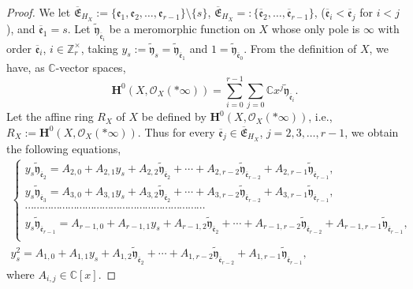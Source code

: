 \documentclass[pdftex]{sigma}
\def\CC{{\mathbb C}}
\def\ZZ{{\mathbb Z}}
\def\bH{{\mathbf F}}
\def\bH{{\mathbf H}}
\def\cO{{\mathcal O}}
\def\fe{{\mathfrak e}}
\def\tfy{{\widetilde{\mathfrak y}}}
\def\BfE{{\overline{\mathfrak E}}}
\def\Bfe{{\overline{\mathfrak e}}}
\numberwithin{equation}{section}
\begin{document}
\begin{proof}We let $\BfE_{H_X} :=\{\fe_1, \fe_2, \dots, \fe_{r-1}\}\setminus \{s\}$, $\BfE_{H_X} =:\{\Bfe_2, \dots, \Bfe_{r-1}\}$, ($\Bfe_i<\Bfe_j$ for $i<j$), and $\Bfe_1=s$.
Let $\tfy_{\Bfe_i}$ be a meromorphic function on $X$ whose only pole is $\infty$ with order $\Bfe_i$, $i\in \ZZ_r^\times$, taking $y_s:=\tfy_{s}=\tfy_{\Bfe_{1}}$ and $1=\tfy_{\Bfe_{0}}$.
From the definition of $X$, we have, as $\CC$-vector spaces,
\begin{equation}
\bH^0(X,\cO_X(*\infty))
= \sum_{i=0}^{r-1}\sum_{j=0} \CC x^j \tfy_{\Bfe_i}.
\label{2eq:R_Xdecompose1}
\end{equation}
Let the affine ring $R_X$ of $X$ be defined by $\bH^0(X,\cO_X(*\infty))$, i.e., $R_X:=\bH^0(X,\cO_X(*\infty))$.
Thus for every $\Bfe_j\in \BfE_{H_X}$, $j=2,3,\dots,r-1$, we obtain the following equations,
\begin{gather}
\begin{cases}
y_{s} \tfy_{\Bfe_2} = A_{2,0} +
 A_{2,1} y_{s}+
 A_{2,2} \tfy_{\Bfe_{2}}+
 \cdots +
 A_{2,r-2} \tfy_{\Bfe_{r-2}}+
 A_{2,r-1} \tfy_{\Bfe_{r-1}}, \\
y_{s} \tfy_{\Bfe_3}= A_{3,0} +
 A_{3,1} y_{s}+
 A_{3,2} \tfy_{\Bfe_{2}}+
 \cdots +
 A_{3,r-2} \tfy_{\Bfe_{r-2}}+
 A_{3,r-1} \tfy_{\Bfe_{r-1}}, \\
\cdots\cdots\cdots\cdots\cdots\cdots\cdots\cdots\cdots\cdots\cdots\cdots\cdots\cdots\cdots\cdots\cdots\cdots\cdots\cdots\cdots\\
y_{s} \tfy_{\Bfe_{r-1}} = A_{{r-1},0} +
 A_{r-1,1} y_{s}+
 A_{r-1,2} \tfy_{\Bfe_{2}}+
 \cdots +
 A_{r-1,r-2} \tfy_{\Bfe_{r-2}}+
 A_{r-1,r-1} \tfy_{\Bfe_{r-1}}, \\
\end{cases}
\label{2eq:WCF2}
\\
y_{s}^2 = A_{1,0} +
 A_{1,1} y_{s}+
 A_{1,2} \tfy_{\Bfe_{2}}+
 \cdots +
 A_{1,r-2} \tfy_{\Bfe_{r-2}}+
 A_{1,r-1} \tfy_{\Bfe_{r-1}},
\label{2eq:WCF3}
\end{gather}
where $A_{i,j} \in \CC[x]$.


\end{proof}
\end{document}
